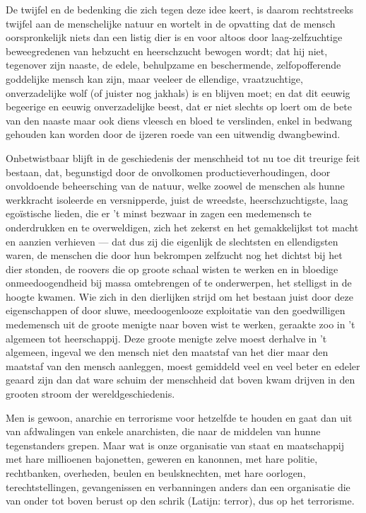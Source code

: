 \documentclass[a4paper, 12pt, oneside, dutch]{article}
\begin{document}
De twijfel en de bedenking die zich tegen deze idee keert, is daarom rechtstreeks twijfel aan de menschelijke natuur en wortelt in de opvatting dat de mensch oorspronkelijk niets dan een listig dier is en voor altoos door laag-zelfzuchtige beweegredenen van hebzucht en heerschzucht bewogen wordt; dat hij niet, tegenover zijn naaste, de edele, behulpzame en beschermende, zelfopofferende goddelijke mensch kan zijn, maar veeleer de ellendige, vraatzuchtige, onverzadelijke wolf (of juister nog jakhals) is en blijven moet; en dat dit eeuwig begeerige en eeuwig onverzadelijke beest, dat er niet slechts op loert om de bete van den naaste maar ook diens vleesch en bloed te verslinden, enkel in bedwang gehouden kan worden door de ijzeren roede van een uitwendig dwangbewind.

Onbetwistbaar blijft in de geschiedenis der menschheid tot nu toe dit treurige feit bestaan, dat, begunstigd door de onvolkomen productieverhoudingen, door onvoldoende beheersching van de natuur, welke zoowel de menschen als hunne werkkracht isoleerde en versnipperde, juist de wreedste, heerschzuchtigste, laag egoïstische lieden, die er 't minst bezwaar in zagen een medemensch te onderdrukken en te overweldigen, zich het zekerst en het gemakkelijkst tot macht en aanzien verhieven --- dat dus zij die eigenlijk de slechtsten en ellendigsten waren, de menschen die door hun bekrompen zelfzucht nog het dichtst bij het dier stonden, de roovers die op groote schaal wisten te werken en in bloedige onmeedoogendheid bij massa omtebrengen of te onderwerpen, het stelligst in de hoogte kwamen. Wie zich in den dierlijken strijd om het bestaan juist door deze eigenschappen of door sluwe, meedoogenlooze exploitatie van den goedwilligen medemensch uit de groote menigte naar boven wist te werken, geraakte zoo in 't algemeen tot heerschappij. Deze groote menigte zelve moest derhalve in 't algemeen, ingeval we den mensch niet den maatstaf van het dier maar den maatstaf van den mensch aanleggen, moest gemiddeld veel en veel beter en edeler geaard zijn dan dat ware schuim der menschheid dat boven kwam drijven in den grooten stroom der wereldgeschiedenis.

Men is gewoon, anarchie en terrorisme voor hetzelfde te houden en gaat dan uit van afdwalingen van enkele anarchisten, die naar de middelen van hunne tegenstanders grepen. Maar wat is onze organisatie van staat en maatschappij met hare millioenen bajonetten, geweren en kanonnen, met hare politie, rechtbanken, overheden, beulen en beulsknechten, met hare oorlogen, terechtstellingen, gevangenissen en verbanningen anders dan een organisatie die van onder tot boven berust op den schrik (Latijn: terror), dus op het terrorisme.
\end{document}

